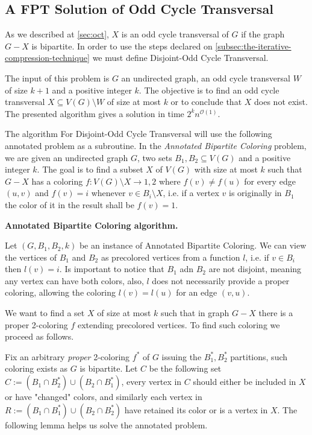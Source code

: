 \subsection{A FPT Solution of Odd Cycle Transversal}\label{subsec:fpt-solution-oct}

As we described at \ref{sec:oct}, $X$ is an odd cycle transversal of $G$ if the graph $G-X$ is bipartite.
In order to use the steps declared on \ref{subsec:the-iterative-compression-technique} we must define Disjoint-Odd Cycle Transversal.

The input of this problem is $G$ an undirected graph, an odd cycle transversal $W$ of size $k+1$ and a positive integer $k$.
The objective is to find an odd cycle transversal $X \subseteq V(G) \setminus W$ of size at most $k$ or to conclude that $X$ does not exist.
The presented algorithm gives a solution in time $2^{k}n^{\mathcal{O}(1)}$.

The algorithm For Disjoint-Odd Cycle Transversal will use the following annotated problem as a subroutine.
In the \emph{Annotated Bipartite Coloring} problem, we are given an undirected graph $G$, two sets $B_1,B_2 \subseteq V(G)$ and a positive integer $k$.
The goal is to find a subset $X$ of $V(G)$ with size at most $k$ such that $G-X$ has a coloring $f : V(G) \setminus X \rightarrow {1,2}$ where $f(v) \neq f(u)$ for every edge $(u,v)$
and $f(v) = i$ whenever $v \in B_i \setminus X$, i.e. if a vertex $v$ is originally in $B_1$ the color of it in the result shall be $f(v)=1$.

\textbf{Annotated Bipartite Coloring algorithm.}

Let $(G,B_1,B_2,k)$ be an instance of Annotated Bipartite Coloring.
We can view the vertices of $B_1$ and $B_2$ as precolored vertices from a function $l$, i.e. if $v \in B_i$ then $l(v)=i$.
Is important to notice that $B_1$ adn $B_2$ are not disjoint, meaning any vertex can have both colors, also, $l$ does not necessarily provide a proper coloring,
allowing the coloring $l(v)=l(u)$ for an edge $(v,u)$.

We want to find a set $X$ of size at most $k$ such that in graph $G-X$ there is a proper 2-coloring $f$ extending precolored vertices.
To find such coloring we proceed as follows.

Fix an arbitrary \emph{proper} 2-coloring $f^*$ of $G$ issuing the $B_1^*,B_2^*$ partitions, such coloring exists as $G$ is bipartite.
Let $C$ be the following set $C := (B_1 \cap B_2^*) \cup (B_2 \cap B_1^*)$, every vertex in $C$ should either be included in $X$ or have "changed" colors,
and similarly each vertex in $R := (B_1 \cap B_1^*) \cup (B_2 \cap B_2^*)$ have retained its color or is a vertex in $X$.
The following lemma helps us solve the annotated problem.

